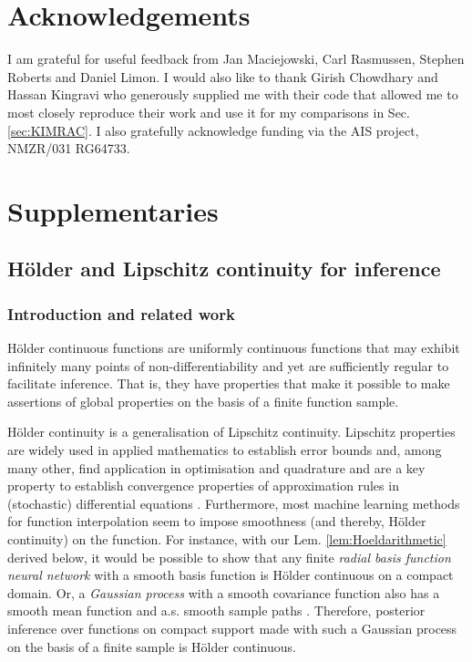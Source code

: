 \documentclass{article} %
\theoremstyle{definition}
\theoremstyle{remark}
\begin{document}
%
%

\section{Acknowledgements}
I am grateful for useful feedback from Jan Maciejowski, Carl Rasmussen, Stephen Roberts and Daniel Limon. I would also like to thank Girish Chowdhary and Hassan Kingravi who generously supplied me with their code that allowed me to most closely reproduce their work and use it for my comparisons in Sec. \ref{sec:KIMRAC}. I also gratefully acknowledge funding via the AIS project, NMZR/031 RG64733.


\appendix 
\section{Supplementaries}
\subsection{H\"older and Lipschitz continuity for inference}%
\label{sec:Hoelder_brief}
\subsubsection{Introduction and related work}



H\"older continuous functions are uniformly continuous functions that may exhibit infinitely many points of non-differentiability and yet are sufficiently regular to facilitate inference. That is, they have properties that make it possible to make assertions of global properties on the basis of a finite function sample. 

H\"older continuity is a generalisation of Lipschitz continuity.  Lipschitz properties are widely used in applied mathematics to establish error bounds and, among many other, find application in optimisation \cite{Shubert:72,direct:93} and quadrature \cite{Baran2008,curbera1998,dereich2006} and are a key property to establish convergence properties of approximation rules in (stochastic) differential equations \cite{kloedenandplaten1992,Gardiner2009}. 
Furthermore, most machine learning methods for function interpolation seem to impose smoothness (and thereby, H\"older continuity) on the function. For instance, with our Lem. \ref{lem:Hoeldarithmetic} derived below, it would be possible to show that any finite \textit{radial basis function neural network} \cite{Broomhead1988} with a smooth basis function is H\"older continuous on a compact domain. Or, a \textit{Gaussian process} with a smooth covariance function also has a smooth mean function and a.s. smooth sample paths  \cite{GPbook:2006,grimmetbook2001}. Therefore, posterior inference over functions on compact support made with such a Gaussian process on the basis of a finite sample is H\"older continuous. 
\end{document}
